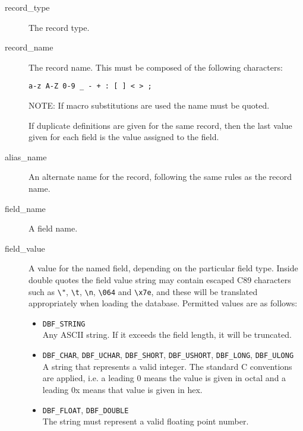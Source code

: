 \begin{description}
\item [record\_type] The record type.

\item [record\_name] The record name.
This must be composed of the following characters:

\begin{verbatim}
a-z A-Z 0-9 _ - + : [ ] < > ;
\end{verbatim}

NOTE: If macro substitutions are used the name must be quoted.

If duplicate definitions are given for the same record, then the last value given for each field is the value assigned 
to the field.

\item [alias\_name] An alternate name for the record, following the same rules as the record name.

\item [field\_name] A field name.

\item [field\_value] A value for the named field, depending on the particular field type.
Inside double quotes the field value string may contain escaped C89 characters such as 
\verb|\"|, \verb|\t|, \verb|\n|, \verb|\064| and \verb|\x7e|, and these will be translated appropriately when loading the database.
Permitted values are as follows:

\begin{itemize}
\item \verb|DBF_STRING| \\
Any ASCII string. If it exceeds the field length, it will be truncated.

\item \verb|DBF_CHAR|, \verb|DBF_UCHAR|, \verb|DBF_SHORT|, \verb|DBF_USHORT|, \verb|DBF_LONG|, \verb|DBF_ULONG| \\
A string that represents a valid integer. The standard C conventions are applied, i.e. a leading 0 means the 
value is given in octal and a leading 0x means that value is given in hex.

\item \verb|DBF_FLOAT|, \verb|DBF_DOUBLE| \\
The string must represent a valid floating point number.


\end{itemize}
\end{description}

